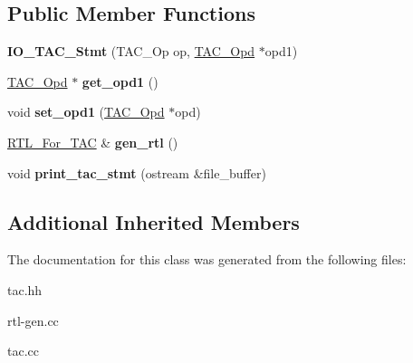 \subsection*{Public Member Functions}
\begin{DoxyCompactItemize}
\item 
\mbox{\label{classIO__TAC__Stmt_acc16fd7c869edf7a981cafb51b3e7f06}} 
{\bfseries I\+O\+\_\+\+T\+A\+C\+\_\+\+Stmt} (T\+A\+C\+\_\+\+Op op, \hyperlink{classTAC__Opd}{T\+A\+C\+\_\+\+Opd} $\ast$opd1)
\item 
\mbox{\label{classIO__TAC__Stmt_a712acca06971c5af83f3c62b5ff04e86}} 
\hyperlink{classTAC__Opd}{T\+A\+C\+\_\+\+Opd} $\ast$ {\bfseries get\+\_\+opd1} ()
\item 
\mbox{\label{classIO__TAC__Stmt_a7f925b2cd81b011f70212570f997203d}} 
void {\bfseries set\+\_\+opd1} (\hyperlink{classTAC__Opd}{T\+A\+C\+\_\+\+Opd} $\ast$opd)
\item 
\mbox{\label{classIO__TAC__Stmt_a3b7a7551023ee553dd6e6c44b97a102f}} 
\hyperlink{classRTL__For__TAC}{R\+T\+L\+\_\+\+For\+\_\+\+T\+AC} \& {\bfseries gen\+\_\+rtl} ()
\item 
\mbox{\label{classIO__TAC__Stmt_a19c54827b271e333a4b8d5a63d78fe58}} 
void {\bfseries print\+\_\+tac\+\_\+stmt} (ostream \&file\+\_\+buffer)
\end{DoxyCompactItemize}
\subsection*{Additional Inherited Members}


The documentation for this class was generated from the following files\+:\begin{DoxyCompactItemize}
\item 
tac.\+hh\item 
rtl-\/gen.\+cc\item 
tac.\+cc\end{DoxyCompactItemize}
